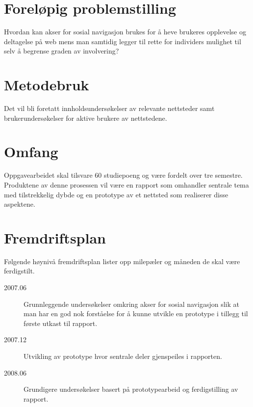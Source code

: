 \documentclass[12pt,a4paper]{article}
\begin{document}
\section{Foreløpig problemstilling}
Hvordan kan akser for sosial navigasjon brukes for å heve brukeres opplevelse
og deltagelse på web mens man samtidig legger til rette for
individers mulighet til selv å begrense graden av involvering?

\section{Metodebruk}
Det vil bli foretatt innholdsundersøkelser av relevante nettsteder samt
brukerundersøkelser for aktive brukere av nettstedene.

\section{Omfang}

Oppgavearbeidet skal tilsvare 60 studiepoeng og være fordelt over tre
semestre. Produktene av denne prosessen vil være en rapport som omhandler
sentrale tema med tilstrekkelig dybde og en prototype av et nettsted som
realiserer disse aspektene.

\section{Fremdriftsplan}

Følgende høynivå fremdriftsplan lister opp milepæler og måneden de skal være
ferdigstilt.

\begin{description}
  \item[2007.06] Grunnleggende undersøkelser omkring akser for sosial
    navigasjon slik at man har en god nok forståelse for å kunne utvikle
    en prototype i tillegg til første utkast til rapport.
  \item[2007.12] Utvikling av prototype hvor sentrale deler gjenspeiles i
    rapporten.
  \item[2008.06] Grundigere undersøkelser basert på prototypearbeid og
    ferdigstilling av rapport.
\end{description}
\end{document}

